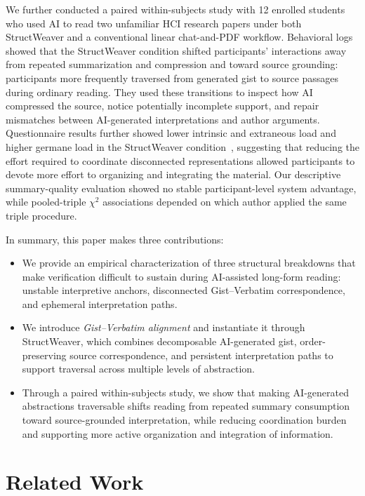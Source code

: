 \documentclass[manuscript,review,anonymous]{acmart}
\begin{document}
We further conducted a paired within-subjects study with 12 enrolled students who used AI to read two unfamiliar HCI research papers under both StructWeaver and a conventional linear chat-and-PDF workflow. Behavioral logs showed that the StructWeaver condition shifted participants' interactions away from repeated summarization and compression and toward source grounding: participants more frequently traversed from generated gist to source passages during ordinary reading. They used these transitions to inspect how AI compressed the source, notice potentially incomplete support, and repair mismatches between AI-generated interpretations and author arguments. Questionnaire results further showed lower intrinsic and extraneous load and higher germane load in the StructWeaver condition~\cite{sweller2011cognitive}, suggesting that reducing the effort required to coordinate disconnected representations allowed participants to devote more effort to organizing and integrating the material. Our descriptive summary-quality evaluation showed no stable participant-level system advantage, while pooled-triple $\chi^2$ associations depended on which author applied the same triple procedure.

In summary, this paper makes three contributions:
\begin{itemize}[leftmargin=*, noitemsep]
    \item We provide an empirical characterization of three structural breakdowns that make verification difficult to sustain during AI-assisted long-form reading: unstable interpretive anchors, disconnected Gist--Verbatim correspondence, and ephemeral interpretation paths.
    
    \item We introduce \textit{Gist--Verbatim alignment} and instantiate it through StructWeaver, which combines decomposable AI-generated gist, order-preserving source correspondence, and persistent interpretation paths to support traversal across multiple levels of abstraction.
    
    \item Through a paired within-subjects study, we show that making AI-generated abstractions traversable shifts reading from repeated summary consumption toward source-grounded interpretation, while reducing coordination burden and supporting more active organization and integration of information.
\end{itemize}




\section{Related Work}
\label{sec:related-work}
\end{document}
